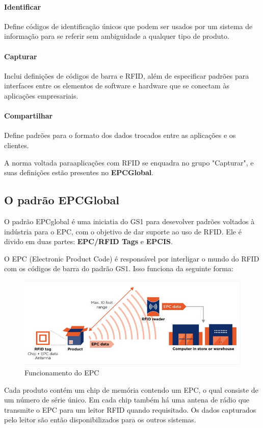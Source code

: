 	\paragraph{Identificar} Define códigos de identificação únicos que podem ser usados por um sistema de informação para se referir sem ambiguidade a qualquer tipo de produto.
	\paragraph{Capturar} Inclui definições de códigos de barra e RFID, além de especificar padrões para interfaces entre os elementos de software e hardware que se conectam às aplicações empresariais.
	\paragraph{Compartilhar} Define padrões para o formato dos dados trocados entre as aplicações e os clientes.     

	A norma voltada paraaplicações com RFID se enquadra no grupo "Capturar", e suas definições estão presentes no \textbf{EPCGlobal}.


\subsection{O padrão EPCGlobal}
	O padrão EPCglobal é uma iniciatia do GS1 para desevolver padrões voltados à indústria para o EPC, com o objetivo de dar suporte ao uso de RFID. Ele é divido em duas partes: \textbf{EPC/RFID Tags} e \textbf{EPCIS}. 
	
	O EPC (Electronic Product Code) é responsável por interligar o mundo do RFID com os códigos de barra do padrão GS1. Isso funciona da seguinte forma:
		\begin{figure}[h!]
			\centering
			\includegraphics[width=0.5\linewidth]{epcrfid}
			\caption{Funcionamento do EPC}
			\label{fig:epcrfid}
		\end{figure}
	
	Cada produto contém um chip de memória contendo um EPC, o qual consiste de um número de série único. Em cada chip também há uma antena de rádio que transmite o EPC para um leitor RFID quando requisitado. Os dados capturados pelo leitor são então disponibilizados para os outros sistemas.
	
